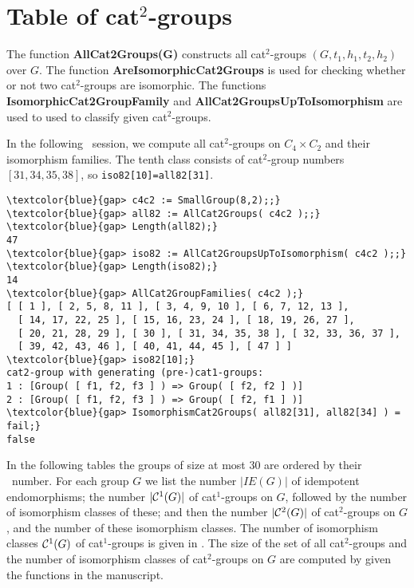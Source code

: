 \documentclass[a4paper,11pt]{article}
\theoremstyle{plain}
\theoremstyle{definition}
\begin{document}
\section{Table of cat$^{2}$-groups}

The function \textbf{AllCat2Groups(G)} constructs all cat$^{2}$-groups 
$(G,t_1,h_1,t_2,h_2)$ over $G$. 
The function \textbf{AreIsomorphicCat2Groups} is used for checking whether 
or not two cat$^{2}$-groups are isomorphic. 
The functions \textbf{IsomorphicCat2GroupFamily} 
and \textbf{AllCat2GroupsUpToIsomorphism} 
are used to used to classify given cat$^{2}$-groups.

In the following \GAP\ session, we compute all cat$^{2}$-groups on $C_{4}
\times C_{2}$ and their isomorphism families. 
The tenth class consists of cat$^2$-group numbers $[31,34,35,38]$, 
so \texttt{iso82[10]=all82[31]}. 

\begin{Verbatim}[frame=single, fontsize=\small, commandchars=\\\{\}]
\textcolor{blue}{gap> c4c2 := SmallGroup(8,2);;}
\textcolor{blue}{gap> all82 := AllCat2Groups( c4c2 );;}
\textcolor{blue}{gap> Length(all82);}
47
\textcolor{blue}{gap> iso82 := AllCat2GroupsUpToIsomorphism( c4c2 );;}
\textcolor{blue}{gap> Length(iso82);}
14
\textcolor{blue}{gap> AllCat2GroupFamilies( c4c2 );}
[ [ 1 ], [ 2, 5, 8, 11 ], [ 3, 4, 9, 10 ], [ 6, 7, 12, 13 ], 
  [ 14, 17, 22, 25 ], [ 15, 16, 23, 24 ], [ 18, 19, 26, 27 ], 
  [ 20, 21, 28, 29 ], [ 30 ], [ 31, 34, 35, 38 ], [ 32, 33, 36, 37 ], 
  [ 39, 42, 43, 46 ], [ 40, 41, 44, 45 ], [ 47 ] ]
\textcolor{blue}{gap> iso82[10];}
cat2-group with generating (pre-)cat1-groups:
1 : [Group( [ f1, f2, f3 ] ) => Group( [ f2, f2 ] )]
2 : [Group( [ f1, f2, f3 ] ) => Group( [ f2, f1 ] )]
\textcolor{blue}{gap> IsomorphismCat2Groups( all82[31], all82[34] ) = fail;}
false
\end{Verbatim}

In the following tables the groups of size at most $30$ are ordered by their
\GAP\ number. 
For each group $G$ we list the number $|IE(G)|$ of idempotent endomorphisms; 
the number $|\mathcal{C}^1(G)|$ of cat$^1$-groups on $G$, 
followed by the number of isomorphism classes of these; 
and then the number $|\mathcal{C}^2(G)|$ of cat$^2$-groups on $G$, 
and the number of these isomorphism classes. 
The number of isomorphism classes $\mathcal{C}^1(G)$ of cat$^{1}$-groups 
is given in \cite{alp-wensley-ijac}. 
The size of the set of all cat$^{2}$-groups and the number of isomorphism classes 
of cat$^{2}$-groups on $G$ are computed by given the functions in the manuscript.
\end{document}
